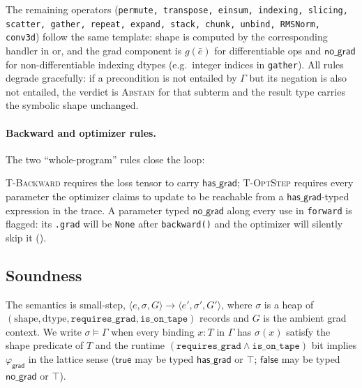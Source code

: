 The remaining operators (\texttt{permute, transpose, einsum,
indexing, slicing, scatter, gather, repeat, expand, stack, chunk,
unbind, RMSNorm, conv3d}) follow the same template: shape is
computed by the corresponding handler in 
or, and the grad component is
$g(\bar e)$ for differentiable ops and $\mathsf{no\_grad}$ for
non-differentiable indexing dtypes (e.g.\ integer indices in
\texttt{gather}). All rules degrade gracefully: if a precondition
is not entailed by $\Gamma$ but its negation is also not entailed,
the verdict is \textsc{Abstain} for that subterm and the result
type carries the symbolic shape unchanged.

\paragraph{Backward and optimizer rules.} The two
``whole-program'' rules close the loop:

{\small
{}}

\textsc{T-Backward} requires the loss tensor to carry
$\mathsf{has\_grad}$; \textsc{T-OptStep} requires every parameter
the optimizer claims to update to be reachable from a
$\mathsf{has\_grad}$-typed expression in the trace. A parameter
typed $\mathsf{no\_grad}$ along every use in \texttt{forward} is
flagged: its \texttt{.grad} will be \texttt{None} after
\texttt{backward()} and the optimizer will silently skip it
().

\subsection{Soundness}
\label{sec:rt:soundness}

The semantics is small-step, $\langle e,\sigma,G\rangle\to\langle
e',\sigma',G'\rangle$, where $\sigma$ is a heap of
$(\mathrm{shape},\mathrm{dtype},\mathtt{requires\_grad},\mathtt{is\_on\_tape})$
records and $G$ is the ambient grad context. We write
$\sigma\models\Gamma$ when every binding $x\!:\!T$ in $\Gamma$ has
$\sigma(x)$ satisfy the shape predicate of $T$ and the runtime
$(\mathtt{requires\_grad}\wedge\mathtt{is\_on\_tape})$ bit
implies $\varphi_{\mathsf{grad}}$ in the lattice sense
($\mathsf{true}$ may be typed $\mathsf{has\_grad}$ or $\top$;
$\mathsf{false}$ may be typed $\mathsf{no\_grad}$ or $\top$).

